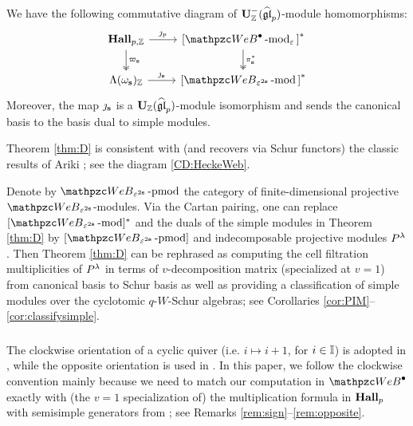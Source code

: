 \begin{alphatheorem}  
    \label{thm:D}  
We have the following commutative diagram of $\bold{U}^-_{\mathbb{Z}}(\widehat{\mathfrak{gl}}_p)$-module homomorphisms: 
\begin{equation}  
\label{diag:comm}
\begin{tikzcd}
{\HallZ} \ar[r,"\jmath_p"]\ar[d,two heads,"\varpi_\bfs"]&{[}\qAW \modf_\eps{]}^* \ar[d,two heads,"\pi_\bfs^*"]\\
\Lambda (\omega_\bfs)_\Z  \ar[r,"\jmath_\bfs"]&{[}\qW_{\eps^{2\bfs}} \modf{]}^* 
\end{tikzcd} 
\end{equation}
Moreover, the map $\jmath_{\mathbf{s}}$ is a $\bold{U}_{\mathbb{Z}}(\widehat{\mathfrak{gl}}_p)$-module isomorphism and sends the canonical basis to the basis dual to simple modules. 
\end{alphatheorem}
Theorem \ref{thm:D} is consistent with (and recovers via Schur functors) the classic results of Ariki \cite{Ar96}; see the diagram \eqref{CD:HeckeWeb}.

Denote by $\qW_{\eps^{2\bfs}} \prmod$ the category of finite-dimensional projective $\qW_{\eps^{2\bfs}}$-modules. Via the Cartan pairing, one can replace $[\qW_{\eps^{2\bfs}}\modf]^*$ and the duals of the simple modules in Theorem \ref{thm:D}  by $[\qW_{\eps^{2\bfs}}\prmod]$ and indecomposable projective modules $P^\lambda$. Then Theorem \ref{thm:D} can be rephrased as computing the cell filtration multiplicities of $P^\lambda$ in terms of $v$-decomposition matrix (specialized at $v=1$) from  canonical basis to Schur basis as well as providing a classification of simple modules over the cyclotomic  $q$-$W$-Schur algebras; see Corollaries \ref{cor:PIM}--\ref{cor:classifysimple}.



\subsubsection{}
The clockwise orientation of a cyclic quiver (i.e. $i\mapsto i+1$, for $i\in\mathbb{I}$) is adopted in \cite{VV99, Sch00, DF15}, while the opposite orientation is used in \cite{Ar96, LTV99}. In this paper, we follow the clockwise convention mainly because we need to match our computation in $\qAW$ exactly with (the $v=1$ specialization of) the multiplication formula in $\bold{Hall}_{p}$ with semisimple generators from \cite{DF15}; see Remarks \ref{rem:sign}--\ref{rem:opposite}. 


